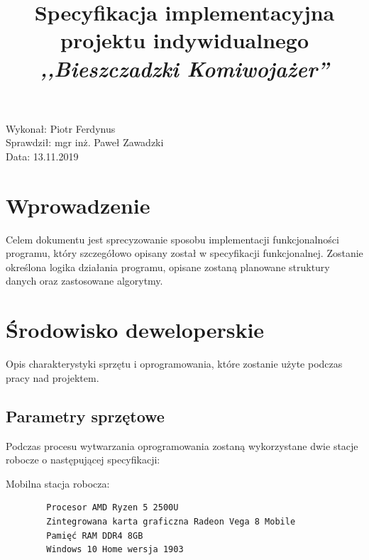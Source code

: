 \documentclass{article}
\title{Specyfikacja implementacyjna projektu indywidualnego \textit{,,Bieszczadzki Komiwojażer''}}
\begin{document}
\begin{titlepage}
\makeatletter
\noindent
\vspace{25pt}
\begin{center}
\Large\textsc{\@title}
\end{center}
\makeatother
\vspace{300pt}
\begin{flushright}
\noindent Wykonał: Piotr Ferdynus\\
Sprawdził: mgr inż. Paweł Zawadzki\\
Data: 13.11.2019\\
\end{flushright}


\thispagestyle{empty}
\end{titlepage}

\lhead{}
\cfoot{\thepage \hspace{1pt} / \pageref{LastPage}}
\setcounter{page}{2}

\section{Wprowadzenie}

Celem dokumentu jest sprecyzowanie sposobu implementacji funkcjonalności programu, który szczegółowo opisany został w specyfikacji funkcjonalnej. Zostanie określona logika działania programu, opisane zostaną planowane struktury danych oraz zastosowane algorytmy.


\section{Środowisko deweloperskie}
Opis charakterystyki sprzętu i oprogramowania, które zostanie użyte podczas pracy nad projektem.

\subsection{Parametry sprzętowe}
Podczas procesu wytwarzania oprogramowania zostaną wykorzystane dwie stacje robocze o następującej specyfikacji:

    Mobilna stacja robocza:
    
\begin{verbatim}
        Procesor AMD Ryzen 5 2500U
        Zintegrowana karta graficzna Radeon Vega 8 Mobile
        Pamięć RAM DDR4 8GB
        Windows 10 Home wersja 1903
\end{verbatim}    
\end{document}
